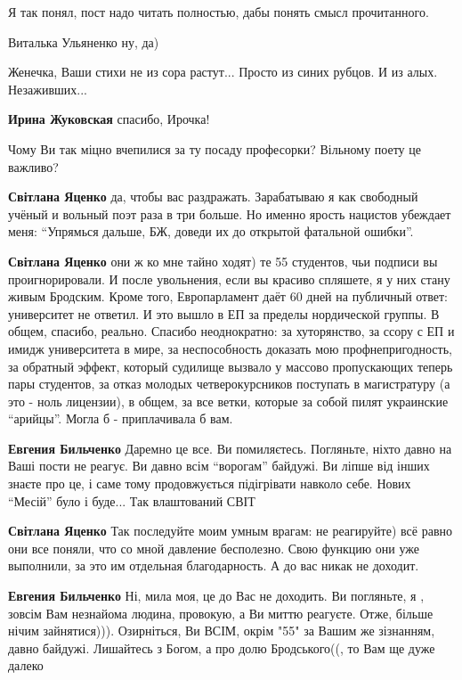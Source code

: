 \begin{itemize}

Я так понял, пост надо читать полностью, дабы понять смысл прочитанного.


Виталька Ульяненко ну, да)


Женечка, Ваши стихи не из сора растут... Просто из синих рубцов. И из алых. Незаживших...


\textbf{Ирина Жуковская} спасибо, Ирочка!


Чому Ви так міцно вчепилися за ту посаду професорки? Вільному поету це важливо?


\textbf{Світлана Яценко} да, чтобы вас раздражать. Зарабатываю я как свободный учёный и
вольный поэт раза в три больше. Но именно ярость нацистов убеждает меня:
\enquote{Упрямься дальше, БЖ, доведи их до открытой фатальной ошибки}.


\textbf{Світлана Яценко} они ж ко мне тайно ходят) те 55 студентов, чьи подписи вы
проигнорировали. И после увольнения, если вы красиво спляшете, я у них стану
живым Бродским. Кроме того, Европарламент даёт 60 дней на публичный ответ:
университет не ответил. И это вышло в ЕП за пределы нордической группы. В
общем, спасибо, реально. Спасибо неоднократно: за хуторянство, за ссору с ЕП и
имидж университета в мире, за неспособность доказать мою профнепригодность, за
обратный эффект, который судилище вызвало у массово пропускающих теперь пары
студентов, за отказ молодых четверокурсников поступать в магистратуру (а это -
ноль лицензии), в общем, за все ветки, которые за собой пилят украинские
\enquote{арийцы}. Могла б - приплачивала б вам.


\textbf{Евгения Бильченко} Даремно це все. Ви помиляєтесь. Погляньте, ніхто
давно на Ваші пости не реагує. Ви давно всім \enquote{ворогам} байдужі. Ви ліпше від
інших знаєте про це, і саме тому продовжується підігрівати навколо себе. Нових
\enquote{Месій} було і буде... Так влаштований СВІТ


\textbf{Світлана Яценко} Так последуйте моим умным врагам: не реагируйте) всё
равно они все поняли, что со мной давление бесполезно. Свою функцию они уже
выполнили, за это им отдельная благодарность. А до вас никак не доходит.


\textbf{Евгения Бильченко} Ні, мила моя, це до Вас не доходить. Ви погляньте, я
, зовсім Вам незнайома людина, провокую, а Ви миттю реагуєте. Отже, більше
нічим зайнятися))).  Озирніться, Ви ВСІМ, окрім "55" за Вашим же зізнанням,
давно байдужі. Лишайтесь з Богом, а про долю Бродського((, то Вам ще дуже
далеко

\end{itemize}
